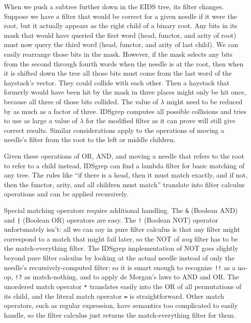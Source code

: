 \documentclass[twocolumn]{report}
\begin{document}
When we push a subtree further down in the EIDS tree, its filter changes. 
Suppose we have a filter that would be correct for a given needle if it were
the root, but it actually appears as the right child of a binary root.  Any
bits in its mask that would have queried the first word (head, functor, and
arity of root) must now query the third word (head, functor, and arity of
last child).  We can easily rearrange those bits in the mask.  However, if
the mask selects any bits from the second through fourth words when the
needle is at the root, then when it is shifted down the tree all those bits
must come from the last word of the haystack's vector.  They could collide
with each other.  Then a haystack that formerly would have been hit by the
mask in three places might only be hit once, because all three of those bits
collided.  The value of $\lambda$ might need to be reduced by as much as a
factor of three.  IDSgrep computes all possible collisions and tries to use
as large a value of $\lambda$ for the modified filter as it can prove will
still give correct results.  Similar considerations apply to the operations
of moving a needle's filter from the root to the left or middle children.

Given these operations of OR, AND, and moving a needle that refers to the
root to refer to a child instead, IDSgrep can find a lambda filter for basic
matching of any tree.  The rules like ``if there is a head, then it must
match exactly, and if not, then the functor, arity, and all children must
match'' translate into filter calculus operations and can be applied
recursively.

Special matching operators require additional handling.  The \texttt{\&}
(Boolean AND) and \texttt{|} (Boolean OR) operators are easy.  The
\texttt{!} (Boolean NOT) operator unfortunately isn't: all we can say in
pure filter calculus is that any filter might correspond to a match that
might fail later, so the NOT of \emph{any} filter has to be the
match-everything filter.  The IDSgrep implementation of NOT goes slightly
beyond pure filter calculus by looking at the actual needle instead of only
the needle's recursively-computed filter; so it is smart enough to recognize
\texttt{!!} as a no-op, \texttt{!?} as match-nothing, and to apply de
Morgan's laws to AND and OR.  The unordered match operator \texttt{*}
translates easily into the OR of all permutations of its child, and the
literal match operator \texttt{=} is straightforward.  Other match
operators, such as regular expression, have semantics too complicated to
easily handle, so the filter calculus just returns the match-everything
filter for them.
\end{document}

